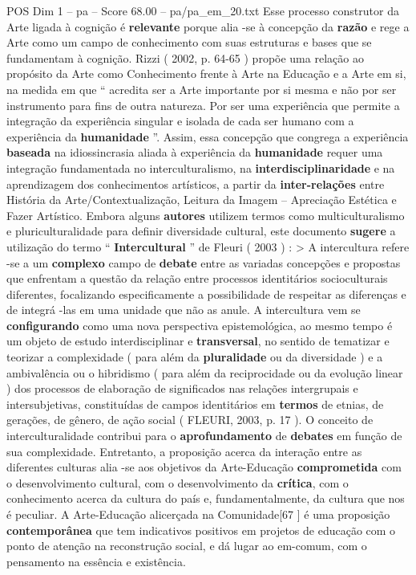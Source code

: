 \begin{textsample}{POS Dim 1 – pa – Score 68.00 – pa/pa\_em\_20.txt}
Esse processo construtor da Arte ligada à cognição é \textbf{relevante} porque alia -se à concepção da \textbf{razão} e rege a Arte como um campo de conhecimento com suas estruturas e bases que se fundamentam à cognição.
Rizzi ( 2002, p. 64-65 ) propõe uma relação ao propósito da Arte como Conhecimento frente à Arte na Educação e a Arte em si, na medida em que “ acredita ser a Arte importante por si mesma e não por ser instrumento para fins de outra natureza.
Por ser uma experiência que permite a integração da experiência singular e isolada de cada ser humano com a experiência da \textbf{humanidade} ”.
Assim, essa concepção que congrega a experiência \textbf{baseada} na idiossincrasia aliada à experiência da \textbf{humanidade} requer uma integração fundamentada no interculturalismo, na \textbf{interdisciplinaridade} e na aprendizagem dos conhecimentos artísticos, a partir da \textbf{inter-relações} entre História da Arte/Contextualização, Leitura da Imagem – Apreciação Estética e Fazer Artístico.
Embora alguns \textbf{autores} utilizem termos como multiculturalismo e pluriculturalidade para definir diversidade cultural, este documento \textbf{sugere} a utilização do termo “ \textbf{Intercultural} ” de Fleuri ( 2003 ) : > A intercultura refere -se a um \textbf{complexo} campo de \textbf{debate} entre as variadas concepções e propostas que enfrentam a questão da relação entre processos identitários socioculturais diferentes, focalizando especificamente a possibilidade de respeitar as diferenças e de integrá -las em uma unidade que não as anule.
A intercultura vem se \textbf{configurando} como uma nova perspectiva epistemológica, ao mesmo tempo é um objeto de estudo interdisciplinar e \textbf{transversal}, no sentido de tematizar e teorizar a complexidade ( para além da \textbf{pluralidade} ou da diversidade ) e a ambivalência ou o hibridismo ( para além da reciprocidade ou da evolução linear ) dos processos de elaboração de significados nas relações intergrupais e intersubjetivas, constituídas de campos identitários em \textbf{termos} de etnias, de gerações, de gênero, de ação social ( FLEURI, 2003, p. 17 ).
O conceito de interculturalidade contribui para o \textbf{aprofundamento} de \textbf{debates} em função de sua complexidade.
Entretanto, a proposição acerca da interação entre as diferentes culturas alia -se aos objetivos da Arte-Educação \textbf{comprometida} com o desenvolvimento cultural, com o desenvolvimento da \textbf{crítica}, com o conhecimento acerca da cultura do país e, fundamentalmente, da cultura que nos é peculiar.
A Arte-Educação alicerçada na Comunidade[67 ] é uma proposição \textbf{contemporânea} que tem indicativos positivos em projetos de educação com o ponto de atenção na reconstrução social, e dá lugar ao em-comum, com o pensamento na essência e existência.

\end{textsample}
